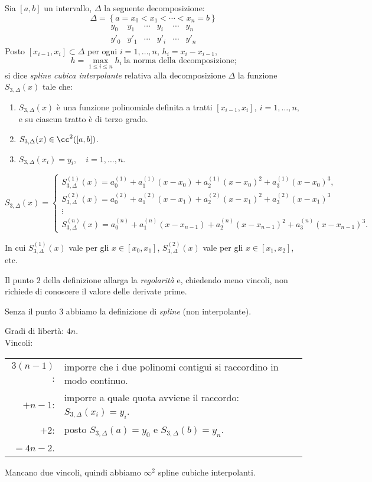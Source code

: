 \begin{defi}
Sia $[a,b]$ un intervallo, $\Delta$ la seguente decomposizione:
\[\Delta = \left\{a = x_0 < x_1 < \cdots < x_n = b\right\}\]
\[\begin{array}{ccccccc}
y_0 & y_1 & \cdots &y_i &\cdots & y_n  \\
y'_0 & y'_1 & \cdots &y'_i &\cdots & y'_n  
\end{array}\]
Posto $[x_{i-1}, x_i] \subset \Delta$ per ogni $i = 1, \ldots, n$, $h_i =
x_i - x_{i-1},$
\[h = \max_{1 \leq i \leq n} h_i \ \textrm{la norma della decomposizione;}\]
si dice \emph{spline cubica interpolante} relativa alla decomposizione
$\Delta$ la funzione $S_{3,\Delta}(x)$ tale che:
\begin{enumerate}
\item $S_{3,\Delta}(x)$ è una funzione polinomiale definita a tratti
$[x_{i-1}, x_i], \ i = 1, \ldots, n,$ e su ciascun tratto è di terzo grado.
\item $S_{3,\Delta}(x) \in \cc^2([a,b])$.
\item $S_{3,\Delta}(x_i) = y_i, \quad i = 1, \ldots, n$.
\end{enumerate}
\end{defi}

\[
S_{3,\Delta}(x) = \left \{
\begin{array}{l}
S_{3,\Delta}^{(1)}(x) =  a_0^{(1)} + a_1^{(1)}(x-x_0) +a_2^{(1)}(x-x_0)^2
+ a_3^{(1)}(x-x_0)^3,  \\
S_{3,\Delta}^{(2)}(x) =  a_0^{(2)} + a_1^{(2)}(x-x_1) +a_2^{(2)}(x-x_1)^2
+ a_3^{(2)}(x-x_1)^3 \\
\vdots \\
S_{3,\Delta}^{(n)}(x) =  a_0^{(n)} + a_1^{(n)}(x-x_{n-1}) +a_2^{(n)}(x-x_{n-1})^2
+ a_3^{(n)}(x-x_{n-1})^3.
\end{array}\right.
\]
\begin{notabene}
In cui $S_{3,\Delta}^{(1)}(x)$ vale per gli $x \in [x_0, x_1]$, 
$S_{3,\Delta}^{(2)}(x)$  vale per gli $x \in [x_1, x_2]$, etc.
\end{notabene}

Il punto $2$ della definizione allarga la \emph{regolarità} e, chiedendo meno
vincoli, non richiede di conoscere il valore delle derivate prime.

Senza il punto $3$ abbiamo la definizione di \emph{spline} (non interpolante).

\begin{flushleft}
Gradi di libertà: $4n$.\\
Vincoli:\\
\begin{tabular}{rl}
$3(n-1)$: & imporre che i due polinomi contigui si raccordino in modo
continuo.\\
$+ n-1$: 
& imporre a quale quota avviene il raccordo: $S_{3,\Delta}(x_i) = y_i$.\\
$+ 2$: & posto $S_{3,\Delta}(a) = y_0$ e $S_{3,\Delta}(b) = y_n$. \\
$= 4n -2$.
\end{tabular}

Mancano due vincoli, quindi abbiamo $\infty^2$ spline cubiche interpolanti.
\end{flushleft}

